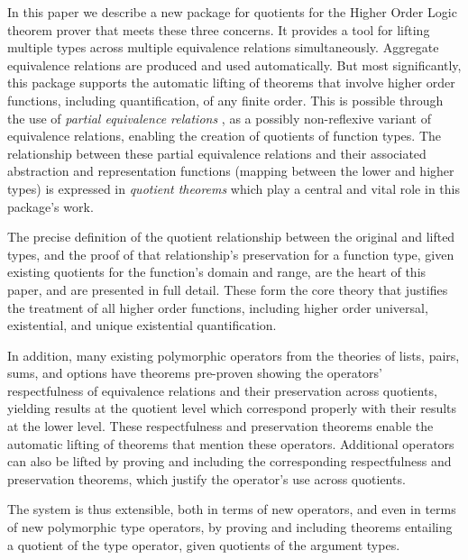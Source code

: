 \documentclass[envcountsame,runningheads]{llncs}
\newcommand{\quotient}{partial equivalence}
\begin{document}
In this paper we describe a new package for quotients for the Higher Order
Logic theorem prover that meets these three concerns.  It provides a tool
for lifting multiple types across multiple equivalence relations simultaneously.
Aggregate equivalence relations are produced and used automatically.
But most significantly,
this package supports the automatic
lifting of theorems that involve higher order functions, including
quantification, of any finite order. 
This is possible through the use of
{\it \quotient{} relations}
\cite{Rob89},
as a possibly non-reflexive variant of
equivalence relations, enabling the creation of quotients
of function types.
The relationship between these \quotient{} relations and their
associated abstraction and representation functions (mapping between the 
lower and higher types)
is expressed in {\it quotient theorems\/} which
play a central and vital role in this package's work.

The precise definition of the quotient relationship between the
original and lifted types, and the proof of that relationship's
preservation
for a function type,
given existing quotients
for the function's domain and range, are the heart of this paper,
and are presented in full detail.
These
form the core theory that
justifies the treatment of all higher order functions,
including higher order 
universal, existential, and unique existential quantification.

In addition, many existing polymorphic operators from the theories of
lists, pairs, sums, and options have theorems pre-proven
showing the operators' respectfulness of equivalence relations and
their preservation across quotients, yielding results at the
quotient level which correspond properly with their results at the lower level.
These respectfulness and preservation theorems enable the automatic
lifting of theorems that mention these operators.  Additional operators
can also be lifted by proving
and including
the corresponding respectfulness and preservation
theorems, which justify the operator's use across quotients.

The system is thus extensible, both in terms of new operators, and even
in terms of new polymorphic type operators, by proving and including
theorems entailing
a quotient
of the type operator,
given quotients
of the
argument types.
\end{document}
